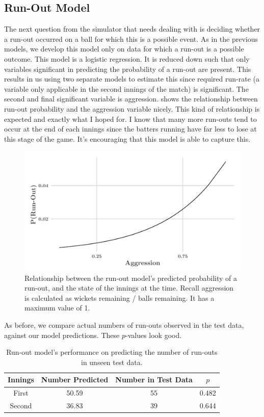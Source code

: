 \subsection{Run-Out Model}

The next question from the simulator that needs dealing with is deciding whether a run-out occurred on a ball for which this is a possible event. As in the previous models, we develop this model only on data for which a run-out is a possible outcome. This model is a logistic regression. It is reduced down such that only variables significant in predicting the probability of a run-out are present. This results in us using two separate models to estimate this since required run-rate (a variable only applicable in the second innings of the match) is significant. The second and final significant variable is aggression.  shows the relationship between run-out probability and the aggression variable nicely. This kind of relationship is expected and exactly what I hoped for. I know that many more run-outs tend to occur at the end of each innings since the batters running have far less to lose at this stage of the game. It's encouraging that this model is able to capture this.

\begin{figure}[ht]
    \centering
    \includegraphics[width=0.75\columnwidth]{images/runoutplot2.jpeg}
    \caption{Relationship between the run-out model's predicted probability of a run-out, and the state of the innings at the time. Recall aggression is calculated as wickets remaining / balls remaining. It has a maximum value of 1.}
    \label{fig: runout}
\end{figure}

As before, we compare actual numbers of run-outs observed in the test data, against our model predictions. These $p$-values look good.

\begin{table}[ht]
\vspace{0.5em}
\centering
\begin{tabular} {c c c c} \toprule
    {Innings} & {Number Predicted} & {Number in Test Data} & {$p$} \\ \midrule
     First & 50.59 & 55 & 0.482 \\
     Second & 36.83 & 39 & 0.644 \\ \bottomrule
\end{tabular}
\caption{Run-out model's performance on predicting the number of run-outs in unseen test data.}
\label{table: runouts}
\end{table}

